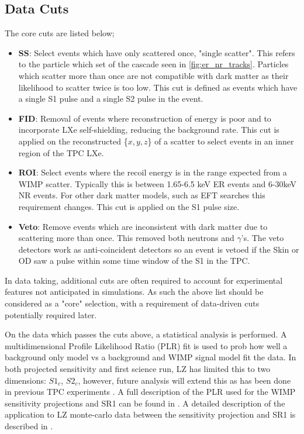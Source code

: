 \par
\subsection{Data Cuts}
\par
The core cuts are listed below;
\begin{itemize}
    \item \textbf{SS}: Select events which have only scattered once, "single scatter". This refers to the particle which set of the cascade seen in \autoref{fig:er_nr_tracks}. Particles which scatter more than once are not compatible with dark matter as their likelihood to scatter twice is too low. This cut is defined as events which have a single S1 pulse and a single S2 pulse in the event.
    \item \textbf{FID}: Removal of events where reconstruction of energy is poor and to incorporate LXe self-shielding, reducing the background rate. This cut is applied on the reconstructed \{$x,y,z$\} of a scatter to select events in an inner region of the TPC LXe.
    \item \textbf{ROI}: Select events where the recoil energy is in the range expected from a WIMP scatter. Typically this is between 1.65-6.5 keV ER events and 6-30keV NR events. For other dark matter models, such as EFT searches this requirement changes. This cut is applied on the S1 pulse size.
    \item \textbf{Veto}: Remove events which are inconsistent with dark matter due to scattering more than once. This removed both neutrons and $\gamma$'s. The veto detectors work as anti-coincident detectors so an event is vetoed if the Skin or OD saw a pulse within some time window of the S1 in the TPC.
\end{itemize}
In data taking, additional cuts are often required to account for experimental features not anticipated in simulations.
As such the above list should be considered as a "core" selection, with a requirement of data-driven cuts potentially required later.

\par
On the data which passes the cuts above, a statistical analysis is performed.
A multidimensional Profile Likelihood Ratio (PLR) fit is used to prob how well a background only model vs a background and WIMP signal model fit the data.
In both projected sensitivity and first science run, LZ has limited this to two dimensions: {$S1_c$, $S2_c$}, however, future analysis will extend this as has been done in previous TPC experiments \cite{LUX_RUN1_EFT_2021,LUX_RUN4_EFT_2021,shaunalsum_thesis_ref}.
A full description of the PLR used for the WIMP sensitivity projections and SR1 can be found in \cite{LZ_Ibles_LZStats_Thesis_ref}. 
A detailed description of the application to LZ monte-carlo data between the sensitivity projection and SR1 is described in \cite{jonathannikoleyczik_thesis_ref}.
